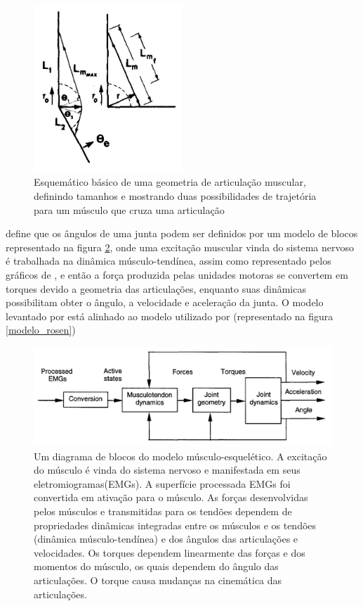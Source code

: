 \begin{figure}[H]
\centering
\includegraphics[width = 0.5\textwidth]{img/Winters_Geometria.JPG}
\caption[Esquema da Geometria da Articulação Muscular]{Esquemático básico de uma geometria de articulação muscular, definindo tamanhos e mostrando duas possibilidades de trajetória para um músculo que cruza uma articulação\cite{winters1988estimated}}
\label{geometria_articulacao}
\end{figure}

 \cite{feng1999surface} define que os ângulos de uma junta podem ser definidos por um modelo de blocos representado na figura \ref{modelo_feng}, onde uma excitação muscular vinda do sistema nervoso é trabalhada na dinâmica músculo-tendínea, assim como representado pelos gráficos de \cite{zajac1989muscle}, e então a força produzida pelas unidades motoras se convertem em torques devido a geometria das articulações, enquanto suas dinâmicas possibilitam obter o ângulo, a velocidade e aceleração da junta. O modelo levantado por \cite{feng1999surface} está alinhado ao modelo utilizado por \cite{rosen1999performances} (representado na figura \ref{modelo_rosen})
 
\begin{figure}[H]
\centering
\includegraphics[width = 1\textwidth]{img/Feng_Modelo.JPG}
\caption[Modelo de Blocos para Obtenção do Ângulo das Articulações - Feng]{Um diagrama de blocos do modelo músculo-esquelético. A excitação do músculo é vinda do sistema nervoso e manifestada em seus eletromiogramas(EMGs). A superfície processada EMGs foi convertida em ativação para o músculo. As forças desenvolvidas pelos músculos e transmitidas para os tendões dependem de propriedades dinâmicas integradas entre os músculos e os tendões (dinâmica músculo-tendínea) e dos ângulos das articulações e velocidades. Os torques dependem linearmente das forças e dos momentos do músculo, os quais dependem do ângulo das articulações. O torque causa mudanças na cinemática das articulações.\cite{feng1999surface}}
\label{modelo_feng}
\end{figure}

